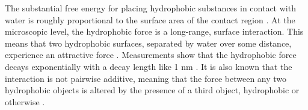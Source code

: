 The substantial free energy for placing hydrophobic substances in contact with water 
is roughly proportional to the surface area of the contact region \cite{Bjorneholm2016}.  
At the microscopic level, the hydrophobic force is a long-range, surface
interaction. This means that two hydrophobic surfaces, separated by
water over some distance, experience an attractive force
\cite{Lum1999,Meyer2006,Hammer2010}. Measurements show that the
hydrophobic force decays exponentially with a decay length like 1 nm
\cite{Israelachvili1984, Marcelja1977,Christenson2001,Lin2005}. It is
also known that the interaction is not pairwise additive, meaning that
the force between any two hydrophobic objects is altered by the presence
of a third object, hydrophobic or otherwise \cite{SilveraBatista1242477}. 

